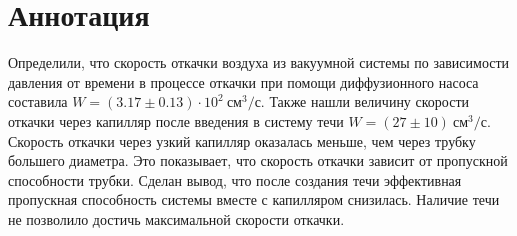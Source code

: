 \chapter*{Аннотация}

Определили, что скорость откачки воздуха из вакуумной системы по зависимости давления от времени в процессе откачки при помощи диффузионного насоса составила $W = (3.17 \pm 0.13) \cdot 10^2~\text{см}^3/\text{с}$. Также нашли величину скорости откачки через капилляр после введения в систему течи $W = (27 \pm 10) \ \text{см}^3 / \text{с}$. Скорость откачки через узкий капилляр оказалась меньше, чем через трубку большего диаметра. Это показывает, что скорость откачки зависит от пропускной способности трубки. Сделан вывод, что после создания течи эффективная пропускная способность системы вместе с капилляром снизилась. Наличие течи не позволило достичь максимальной скорости откачки.